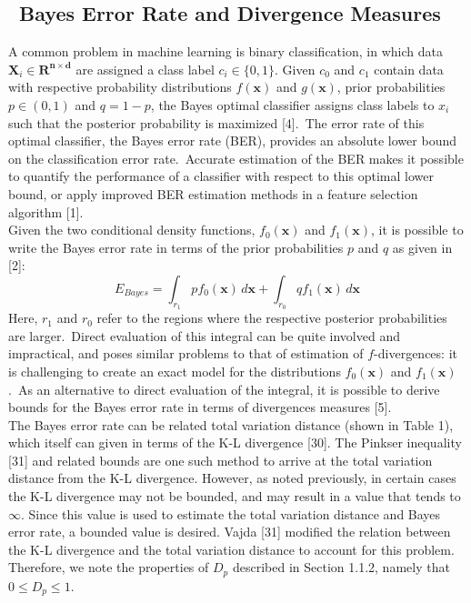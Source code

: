 \documentclass{article}
\begin{document}
	\subsection{\ Bayes Error Rate and Divergence Measures}
	\indent A common problem in machine learning is binary classification, in which data $\textbf{X}_i\in \mathbf{R^{n \times d}}$ are assigned a class label $c_i \in \{0,1\}$.
	Given $c_0$ and $c_1$ contain data with respective probability distributions $f(\textbf{x})$ and $g(\textbf{x})$, prior probabilities $p \in (0,1)$ and $q=1-p$, the Bayes optimal classifier assigns class labels to $x_i$ such that the posterior probability is maximized [4].\ The error rate of this optimal classifier, the Bayes error rate (BER), provides an absolute lower bound on the classification error rate.\ Accurate estimation of the BER makes it possible to quantify the performance of a classifier with respect to this optimal lower bound, or apply improved BER estimation methods in a feature selection algorithm [1]. 
	\\ [0.5ex]
	\indent Given the two conditional density functions, $f_0(\textbf{x})$ and $f_1(\textbf{x})$, it is possible to write the Bayes error rate in terms of the prior probabilities $p$ and $q$ as given in [2]:
	\begin{equation} E_{Bayes}=\int_{r_1} pf_0(\textbf{x}) \,d\textbf{x} + \int_{r_0} qf_1(\textbf{x}) \,d\textbf{x} \end{equation}
	\indent Here, $r_1$ and $r_0$ refer to the regions where the respective posterior probabilities are larger.\ Direct evaluation of this integral can be quite involved and impractical, and poses similar problems to that of estimation of $f$-divergences: it is challenging to create an exact model for the distributions $f_0(\textbf{x})$ and $f_1(\textbf{x})$.\ As an alternative to direct evaluation of the integral, it is possible to derive bounds for the Bayes error rate in terms of divergences measures [5]. 
	\\ [0.5ex]	
	\indent The Bayes error rate can be related total variation distance (shown in Table 1), which itself can given in terms of the K-L divergence [30]. The Pinkser inequality [31] and related bounds are one such method to arrive at the total variation distance from the K-L divergence. However, as noted previously, in certain cases the K-L divergence may not be bounded, and may result in a value that tends to $\infty$. Since this value is used to estimate the total variation distance and Bayes error rate, a bounded value is desired. Vajda [31] modified the relation between the K-L divergence and the total variation distance to account for this problem. Therefore, we note the properties of $D_p$ described in Section 1.1.2, namely that $0 \leq D_p \leq 1$. 
	\\ [0.5ex]
\end{document}

